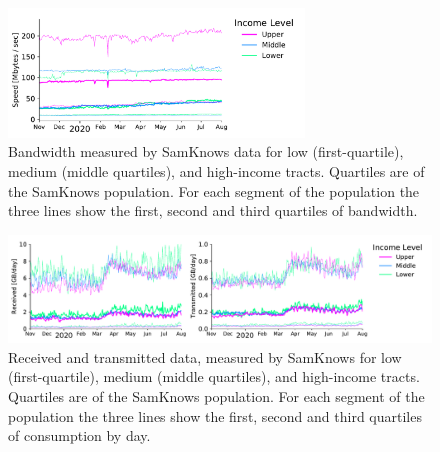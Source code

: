 \documentclass[11 pt]{amsart}
\begin{document}
\begin{figure}[]
\centering
\includegraphics[width=0.7\textwidth]{sk_bandwidth.pdf}
\caption{Bandwidth measured by SamKnows data for low (first-quartile), medium (middle quartiles), and high-income tracts. Quartiles are of the SamKnows population. For each segment of the population the three lines show the first, second and third quartiles of bandwidth. \label{fig:sk_bandwidth}}
\end{figure}

\begin{figure}[]
\centering
\includegraphics[width=1.0\textwidth]{sk_consumption.pdf}
\caption{Received and transmitted data, measured by SamKnows for low (first-quartile), medium (middle quartiles), and high-income tracts.  Quartiles are of the SamKnows population.  For each segment of the population the three lines show the first, second and third quartiles of consumption by day. \label{fig:sk_consumption}}
\end{figure}






\end{document}
